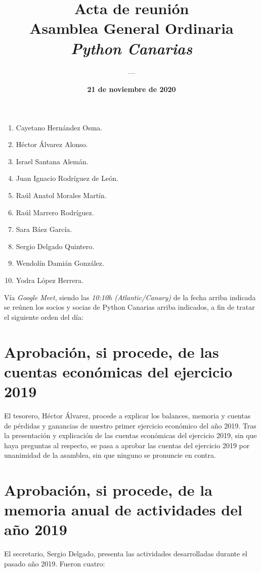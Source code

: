 \documentclass[a4paper, 12pt]{article}
\title{\huge \textbf{Acta de reunión} \\ Asamblea General Ordinaria \\ \textit{Python Canarias}}
\date{\textbf{21 de noviembre de 2020}}
\author{---}
\begin{document}
\renewcommand{\contentsname}{Orden del día}

\maketitle

\begin{enumerate}
    \item Cayetano Hernández Osma.
    \item Héctor Álvarez Alonso.
    \item Israel Santana Alemán.
    \item Juan Ignacio Rodríguez de León.
    \item Raúl Anatol Morales Martín.
    \item Raúl Marrero Rodríguez.
    \item Sara Báez García.
    \item Sergio Delgado Quintero.
    \item Wendolín Damián González.
    \item Yodra López Herrera.
\end{enumerate}

Vía \textit{Google Meet}, siendo las \textit{10:10h (Atlantic/Canary)} de la fecha arriba indicada se reúnen los socios y socias de Python Canarias arriba indicados, a fin de tratar el siguiente orden del día:

\tableofcontents

\section{Aprobación, si procede, de las cuentas económicas del ejercicio 2019}

El tesorero, Héctor Álvarez, procede a explicar los balances, memoria y cuentas de pérdidas y ganancias de nuestro primer ejercicio económico del año 2019. Tras la presentación y explicación de las cuentas económicas del ejercicio 2019, sin que haya preguntas al respecto, se pasa a aprobar las cuentas del ejercicio 2019 por unanimidad de la asamblea, sin que ninguno se pronuncie en contra.

\section{Aprobación, si procede, de la memoria anual de actividades del año 2019}

El secretario, Sergio Delgado, presenta las actividades desarrolladas durante el pasado año 2019. Fueron cuatro:
\end{document}
